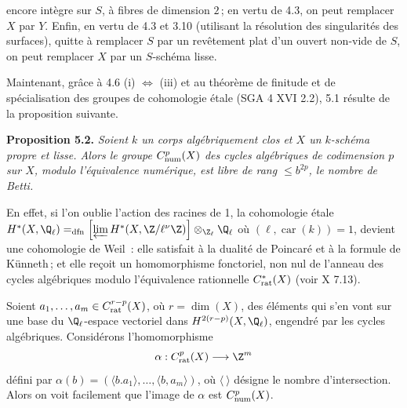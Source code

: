
encore int\`egre sur \(S\), \`a fibres de dimension \(2\)\,; en vertu de 4.3, on peut remplacer \(X\) par \(Y\). Enfin, en vertu de 4.3 et 3.10 (utilisant la r\'esolution des singularit\'es des surfaces), quitte \`a remplacer \(S\) par un rev\^etement plat d'un ouvert non-vide de \(S\), on peut remplacer \(X\) par un \(S\)-sch\'ema lisse.

Maintenant, gr\^ace \`a 4.6 (i) \(\Longleftrightarrow\) (iii) et au th\'eor\`eme de finitude et de sp\'ecialisation des groupes de cohomologie \'etale (SGA 4 XVI 2.2), 5.1 r\'esulte de la proposition suivante.

\textbf{Proposition 5.2.} \emph{Soient \(k\) un corps alg\'ebriquement clos et \(X\) un \(k\)-sch\'ema propre et lisse. Alors le groupe \(C^p_{\rm num}(X)\) des cycles alg\'ebriques de codimension \(p\) sur \(X\), modulo l'\'equivalence num\'erique, est libre de rang \(\le b^{2p}\), le nombre de Betti.}

En effet, si l'on oublie l'action des racines de 1, la cohomologie \'etale \(H^*(X,\Q_\ell)=_{\rm dfn}\left[\varprojlim H^*(X,\Z/\ell^\nu\Z)\right]\otimes_{\Z_\ell}\Q_\ell\) o\`u \((\ell,\operatorname{car}(k))=1\), devient une cohomologie de Weil~: elle satisfait \`a la dualit\'e de Poincar\'e et \`a la formule de K\"unneth\,; et elle re\c{c}oit un homomorphisme fonctoriel, non nul de l'anneau des cycles alg\'ebriques modulo l'\'equivalence rationnelle \(C^*_{\rm rat}(X)\) (voir X 7.13).

Soient \(a_1,\ldots,a_m\in C^{r-p}_{\rm rat}(X)\), o\`u \(r=\dim(X)\), des \'el\'ements qui s'en vont sur une base du \(\Q_\ell\)-espace vectoriel dans \(H^{2(r-p)}(X,\Q_\ell)\), engendr\'e par les cycles alg\'ebriques. Consid\'erons l'homomorphisme
\[
   \alpha:C^p_{\rm rat}(X)\longrightarrow \Z^m
\]
d\'efini par \(\alpha(b)=(\langle b.a_1\rangle,\ldots,\langle b,a_m\rangle)\), o\`u \(\langle\ \rangle\) d\'esigne le nombre d'intersection. Alors on voit facilement que l'image de \(\alpha\) est \(C^p_{\rm num}(X)\).

